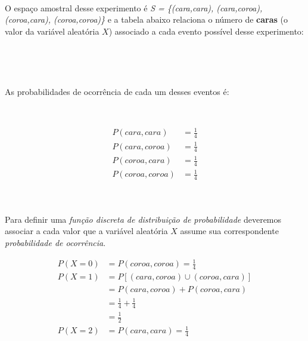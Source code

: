 \documentclass[
]{book}
\begin{document}
~

O espaço amostral desse experimento é \emph{S = \{(cara,cara), (cara,coroa), (coroa,cara), (coroa,coroa)\}} e a tabela abaixo relaciona o número de \textbf{caras} (o valor da variável aleatória \(X\)) associado a cada evento possível desse experimento:

~

\begin{table}[]
\end{table}

~

As probabilidades de ocorrência de cada um desses eventos é:

~

\begin{align*}
P(cara,cara) & = \frac{1}{4} \\
P(cara,coroa) & = \frac{1}{4}\\  
P(coroa,cara) & = \frac{1}{4} \\
P(coroa,coroa) & = \frac{1}{4}\\
\end{align*}

~

Para definir uma \emph{função discreta de distribuição de probabilidade} deveremos associar a cada valor que a variável aleatória \(X\) assume sua correspondente \emph{probabilidade de ocorrência}.

\begin{align*}
P(X=0) & = P(coroa,coroa) = \frac{1}{4} \\  
P(X=1) & = P[(cara,coroa) \cup (coroa,cara)] \\
       & = P(cara,coroa) + P(coroa,cara)\\
       & = \frac{1}{4} + \frac{1}{4} \\
       & = \frac{1}{2} \\
P(X=2) & = P(cara,cara) = \frac{1}{4}
\end{align*}

~

\begin{table}[]
\caption*{Função discreta de probabilidades da variável aleatória X}
\end{table}
\end{document}
